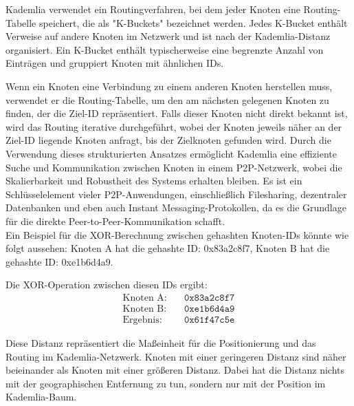 Kademlia verwendet ein Routingverfahren, bei dem jeder Knoten eine Routing-\\
Tabelle 
speichert, die als "K-Buckets" bezeichnet werden. Jedes K-Bucket enthält Verweise 
auf andere Knoten im Netzwerk und ist nach der Kademlia-Distanz organisiert. Ein 
K-Bucket enthält typischerweise eine begrenzte Anzahl von Einträgen und gruppiert 
Knoten mit ähnlichen IDs.

Wenn ein Knoten eine Verbindung zu einem anderen Knoten herstellen muss, verwendet 
er die Routing-Tabelle, um den am nächsten gelegenen Knoten zu finden, der die 
Ziel-ID repräsentiert. Falls dieser Knoten nicht direkt bekannt ist, wird das 
Routing iterative durchgeführt, wobei der Knoten jeweils näher an der Ziel-ID 
liegende Knoten anfragt, bis der Zielknoten gefunden wird. Durch die Verwendung 
dieses strukturierten Ansatzes ermöglicht Kademlia eine effiziente Suche und 
Kommunikation zwischen Knoten in einem P2P-Netzwerk, wobei die Skalierbarkeit 
und Robustheit des Systems erhalten bleiben. Es ist ein Schlüsselelement vieler 
P2P-Anwendungen, einschließlich Filesharing, dezentraler Datenbanken und eben auch 
Instant Messaging-Protokollen, da es die Grundlage für die direkte 
Peer-to-Peer-Kommunikation schafft.
\\

\noindent Ein Beispiel für die XOR-Berechnung zwischen gehashten Knoten-IDs könnte wie folgt 
aussehen:
Knoten A hat die gehashte ID: 0x83a2c8f7,  
Knoten B hat die gehashte ID: 0xe1b6d4a9.

\noindent Die XOR-Operation zwischen diesen IDs ergibt:
\begin{equation}
    \begin{aligned}
        \text{Knoten A:} & \quad \texttt{0x83a2c8f7} \\
        \text{Knoten B:} & \quad \texttt{0xe1b6d4a9} \\
        \text{Ergebnis:} & \quad \texttt{0x61f47c5e}
    \end{aligned}
\end{equation}


\noindent Diese Distanz repräsentiert die Maßeinheit für die Positionierung und das Routing 
im Kademlia-Netzwerk. Knoten mit einer geringeren Distanz sind näher beieinander
als Knoten mit einer größeren Distanz. Dabei hat die Distanz nichts mit der
geographischen Entfernung zu tun, sondern nur mit der Position im Kademlia-Baum.